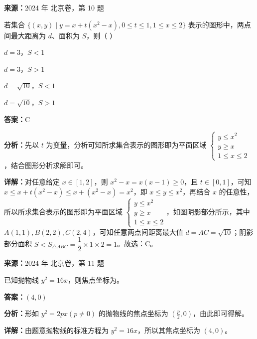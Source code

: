 \begin{question}[points=4]
\textbf{来源：}2024 年 北京卷，第 10 题\par
若集合 $\{(x,y) \mid y = x + t(x^2 - x), 0 \leq t \leq 1, 1 \leq x \leq 2\}$ 表示的图形中，两点间最大距离为 $d$、面积为 $S$，则（ ）
\begin{choices}
  \item $d = 3$，$S < 1$
  \item $d = 3$，$S > 1$
  \item $d = \sqrt{10}$，$S < 1$
  \item $d = \sqrt{10}$，$S > 1$
\end{choices}
\begin{solution}
\textbf{答案：}C

\textbf{分析：}先以 $t$ 为变量，分析可知所求集合表示的图形即为平面区域 $\begin{cases} y \leq x^2 \\ y \geq x \\ 1 \leq x \leq 2 \end{cases}$，结合图形分析求解即可。

\textbf{详解：}对任意给定 $x \in [1,2]$，则 $x^2 - x = x(x-1) \geq 0$，且 $t \in [0,1]$，可知 $x \leq x + t(x^2 - x) \leq x + (x^2 - x) = x^2$，即 $x \leq y \leq x^2$，再结合 $x$ 的任意性，所以所求集合表示的图形即为平面区域 $\begin{cases} y \leq x^2 \\ y \geq x \\ 1 \leq x \leq 2 \end{cases}$，如图阴影部分所示，其中 $A(1,1), B(2,2), C(2,4)$，可知任意两点间距离最大值 $d = AC = \sqrt{10}$；阴影部分面积 $S < S_{\triangle ABC} = \dfrac{1}{2} \times 1 \times 2 = 1$。故选：C。
\end{solution}
\end{question}

\begin{question}[points=5]
\textbf{来源：}2024 年 北京卷，第 11 题\par
已知抛物线 $y^2 = 16x$，则焦点坐标为。
\fillin[{$(4,0)$}]
\begin{solution}
\textbf{答案：}$(4,0)$

\textbf{分析：}形如 $y^2 = 2px (p \neq 0)$ 的抛物线的焦点坐标为 $(\frac{p}{2},0)$，由此即可得解。

\textbf{详解：}由题意抛物线的标准方程为 $y^2 = 16x$，所以其焦点坐标为 $(4,0)$。
\end{solution}
\end{question}

